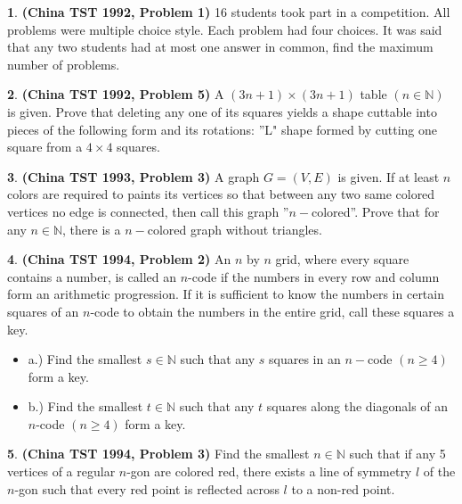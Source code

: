 \documentclass{article}
\theoremstyle{definition}
\newtheorem{p}{}
\begin{document}
\begin{p}{\bf (China TST 1992, Problem 1)}
16 students took part in a competition. All problems were multiple choice style. Each problem had four choices. It was said that any two students had at most one answer in common, find the maximum number of problems.
\end{p}





\begin{p}{\bf (China TST 1992, Problem 5)}
A $(3n + 1) \times (3n + 1)$ table $(n \in \mathbb{N})$ is given. Prove that deleting any one of its squares yields a shape cuttable into pieces of the following form and its rotations: ''L" shape formed by cutting one square from a $4 \times 4$ squares.
\end{p}





\begin{p}{\bf (China TST 1993, Problem 3)}
A graph $G=(V,E)$ is given. If at least $n$ colors are required to paints its vertices so that between any two same colored vertices no edge is connected, then call this graph ''$n-$colored''. Prove that for any $n \in \mathbb{N}$, there is a $n-$colored graph without triangles.
\end{p}




\begin{p}{\bf(China TST 1994, Problem 2)}
An $n$ by $n$ grid, where every square contains a number, is called an $n$-code if the numbers in every row and column form an arithmetic progression.  If it is sufficient to know the numbers in certain squares of an $n$-code to obtain the numbers in the entire grid, call these squares a key.
\begin{itemize}

\item a.) Find the smallest $s \in \mathbb{N}$  such that any $s$ squares in an $n-$code $(n \geq 4)$ form a key.

\item b.) Find the smallest $t \in \mathbb{N}$ such that any $t$ squares along the diagonals of an $n$-code $(n \geq 4)$ form a key.
\end{itemize}
\end{p}





\begin{p}{\bf(China TST 1994, Problem 3)}
Find the smallest $n \in \mathbb{N}$ such that if any 5 vertices of a regular $n$-gon are colored red, there exists a line of symmetry $l$ of the $n$-gon such that every red point is reflected across $l$ to a non-red point.
\end{p}
\end{document}
